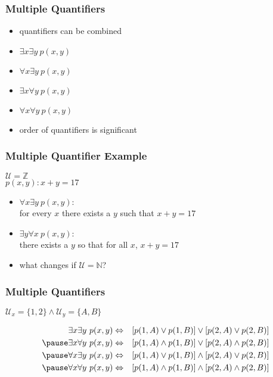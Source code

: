 \documentclass[dvipsnames]{beamer}
\begin{document}
\begin{frame}
  \frametitle{Multiple Quantifiers}

  \begin{itemize}
    \item quantifiers can be combined

    \medskip
    \item $\exists x \exists y~p(x,y)$
    \item $\forall x \exists y~p(x,y)$
    \item $\exists x \forall y~p(x,y)$
    \item $\forall x \forall y~p(x,y)$

    \medskip
    \item order of quantifiers is significant
  \end{itemize}
\end{frame}

\begin{frame}
  \frametitle{Multiple Quantifier Example}

  $\mathcal{U}=\mathbb{Z}$\\
  $p(x,y): x+y=17$

  \pause
  \medskip
  \begin{itemize}
    \item $\forall x \exists y~p(x,y)$:\\
      for every $x$ there exists a $y$ such that $x+y=17$

    \pause
    \item $\exists y \forall x~p(x,y)$:\\
      there exists a $y$ so that for all $x$,  $x+y=17$

    \pause
    \medskip
    \item what changes if $\mathcal{U}=\mathbb{N}$?
  \end{itemize}
\end{frame}

\begin{frame}
  \frametitle{Multiple Quantifiers}

  \begin{center}
    $\mathcal{U}_x = \{1,2\} \wedge \mathcal{U}_y = \{A,B\}$
  \end{center}

  \begin{eqnarray*}
    \exists x \exists y~p(x,y) & \Leftrightarrow & [p(1,A) \vee p(1,B)]
                                      \vee [p(2,A) \vee p(2,B)]\\\pause
    \exists x \forall y~p(x,y) & \Leftrightarrow & [p(1,A) \wedge p(1,B)]
                                      \vee [p(2,A) \wedge p(2,B)]\\\pause
    \forall x \exists y~p(x,y) & \Leftrightarrow & [p(1,A) \vee p(1,B)]
                                    \wedge [p(2,A) \vee p(2,B)]\\\pause
    \forall x \forall y~p(x,y) & \Leftrightarrow & [p(1,A) \wedge p(1,B)]
                                    \wedge [p(2,A) \wedge p(2,B)]
  \end{eqnarray*}
\end{frame}
\end{document}
